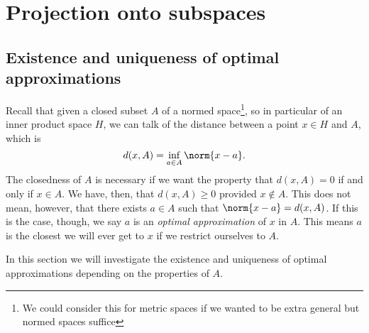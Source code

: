 \documentclass[12pt,oneside]{book}
\begin{document}
\chapter{Projection onto subspaces}
\section{Existence and uniqueness of optimal approximations}
Recall that given a closed subset \( A \) of a normed space\footnote{We could consider
this for metric spaces if we wanted to be extra general but normed spaces suffice}, so in
particular of an inner product space \( H \), we can talk of the distance between a point
\( x \in H \) and \( A \), which is
\begin{equation*}
	d(x,A) = \inf_{a \in A} \norm{x - a}.
\end{equation*}
The closedness of \( A \) is necessary if we want the property that \( d(x,A) = 0 \) if
and only if \( x \in A \). We have, then, that \( d(x,A) \geq 0 \) provided \( x \notin A
\). This does not mean, however, that there exists \( a \in A \) such that \( \norm{x - a}
= d(x,A) \). If this is the case, though, we say \( a \) is an \emph{optimal
approximation} of \( x \) in \( A \). This means \( a \) is the closest we will ever get
to \( x \) if we restrict ourselves to \( A \).

In this section we will investigate the existence and uniqueness of optimal approximations
depending on the properties of \( A \).
\end{document}
